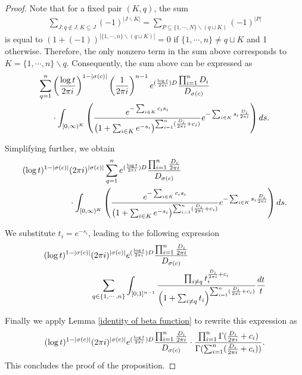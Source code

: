 \documentclass[11pt,reqno]{amsart}
\theoremstyle{definition}
\numberwithin{equation}{section}
\begin{document}
\begin{proof}
\smallskip

Note that for a fixed pair $(K,q)$, the sum
\begin{align*}
	\sum_{J:q\not\in J,K\subseteq J}(-1)^{|J\backslash K|}=\sum_{P\subseteq\{1,\cdots, N\}\backslash(q\sqcup K)}(-1)^{|P|}
\end{align*}
is equal to $(1+(-1))^{|\{1,\cdots, n\}\backslash(q\sqcup K)|}=0$ if $\{1,\cdots, n\}\not=q\sqcup K$ and 1 otherwise. Therefore, the only nonzero term in the sum above corresponds to $K=\{1,\cdots,n\}\backslash q$. Consequently, the sum above can be expressed as
\begin{align*}
	\sum_{q=1}^n&\left(\frac{\log t}{2\pi{\rm i}}\right)^{1-|\sigma(c)|}\left(\frac{1}{2\pi {\rm i}}\right)^{n-1}e^{(\frac{\log t}{2\pi {\rm i}}) D}\frac{\prod_{i=1}^n D_i}{D_{\sigma(c)}}\\
	&\cdot\int_{[0,\infty)^K}\left(\frac{e^{-\sum_{i\in K}c_is_i}}{\left(1+\sum_{i\in K}e^{-s_i}\right)^{\sum_{i=1}^n(\frac{D_i}{2\pi{\rm i}}+c_i)}}e^{-\sum_{i\in K}s_i \frac{D_i}{2\pi{\rm i}}}\right)ds .
\end{align*}

\smallskip

Simplifying further, we obtain
\begin{align*}
	(\log t)^{1-|\sigma(c)|}&(2\pi {\rm i})^{|\sigma(c)|}\sum_{q=1}^n e^{(\frac{\log t}{2\pi {\rm i}}) D}\frac{\prod_{i=1}^n\frac{D_i}{2\pi{\rm i}}}{D_{\sigma(c)}}\\
	&\cdot\int_{[0,\infty)^K}\left(\frac{e^{-\sum_{i\in K}c_is_i}}{\left(1+\sum_{i\in K}e^{-s_i}\right)^{\sum_{i=1}^n(\frac{D_i}{2\pi{\rm i}}+c_i)}}e^{-\sum_{i\in K}s_i \frac{D_i}{2\pi{\rm i}}}\right)ds .
\end{align*}

\smallskip

We substitute $t_i=e^{-s_i}$, leading to the following expression
\begin{align*}
	(\log t)^{1-|\sigma(c)|}&(2\pi {\rm i})^{|\sigma(c)|}e^{(\frac{\log t}{2\pi {\rm i}}) D} \frac{\prod_{i=1}^n \frac{D_i}{2\pi {\rm i}}}{D_{\sigma(c)}}\\
	&\sum_{q\in\{1,\cdots, n\}}\int_{[0,1]^{n-1}}\frac{\prod_{i\not=q}t_i^{\frac{D_i}{2\pi{\rm i}}+c_i}}{\left(1+\sum_{i\not=q}t_i\right)^{\sum_{i=1}^n(\frac{D_i}{2\pi{\rm i}}+c_i)}}\frac{dt}{t}
\end{align*}

\smallskip


Finally we apply Lemma \ref{identity of beta function} to rewrite this expression as
\begin{align*}
	(\log t)^{1-|\sigma(c)|}(2\pi {\rm i})^{|\sigma(c)|}e^{(\frac{\log t}{2\pi {\rm i}}) D}\frac{\prod_{i=1}^n \frac{D_i}{2\pi{\rm i}}}{D_{\sigma(c)}}\cdot\frac{\prod_{i=1}^n\Gamma(\frac{D_i}{2\pi{\rm i}}+c_i)}{\Gamma(\sum_{i=1}^n(\frac{D_i}{2\pi{\rm i}}+c_i))} .
\end{align*}
This concludes the proof of the proposition.
\end{proof}
\end{document}
